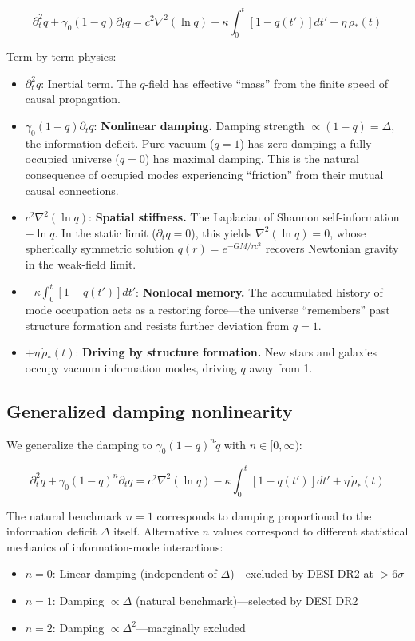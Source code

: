 \documentclass[12pt,a4paper]{article}
\begin{document}
\begin{equation}\label{sm:telegraph}
\boxed{\partial_t^2 q + \gamma_0(1-q)\partial_t q = c^2\nabla^2(\ln q) - \kappa\int_0^t [1-q(t')]dt' + \eta\,\dot{\rho}_*(t)}
\end{equation}

Term-by-term physics:
\begin{itemize}
\item $\partial_t^2 q$: Inertial term. The $q$-field has effective ``mass'' from the finite speed of causal propagation.
\item $\gamma_0(1-q)\partial_t q$: {\bf Nonlinear damping.} Damping strength $\propto(1-q)=\Delta$, the information deficit. Pure vacuum ($q=1$) has zero damping; a fully occupied universe ($q=0$) has maximal damping. This is the natural consequence of occupied modes experiencing ``friction'' from their mutual causal connections.
\item $c^2\nabla^2(\ln q)$: {\bf Spatial stiffness.} The Laplacian of Shannon self-information $-\ln q$. In the static limit ($\partial_t q=0$), this yields $\nabla^2(\ln q)=0$, whose spherically symmetric solution $q(r)=e^{-GM/rc^2}$ recovers Newtonian gravity in the weak-field limit.
\item $-\kappa\int_0^t [1-q(t')]dt'$: {\bf Nonlocal memory.} The accumulated history of mode occupation acts as a restoring force---the universe ``remembers'' past structure formation and resists further deviation from $q=1$.
\item $+\eta\,\dot{\rho}_*(t)$: {\bf Driving by structure formation.} New stars and galaxies occupy vacuum information modes, driving $q$ away from 1.
\end{itemize}

\subsection{Generalized damping nonlinearity}

We generalize the damping to $\gamma_0(1-q)^n\dot{q}$ with $n\in[0,\infty)$:

\begin{equation}
\partial_t^2 q + \gamma_0(1-q)^n\partial_t q = c^2\nabla^2(\ln q) - \kappa\int_0^t [1-q(t')]dt' + \eta\,\dot{\rho}_*(t)
\end{equation}

The natural benchmark $n=1$ corresponds to damping proportional to the information deficit $\Delta$ itself. Alternative $n$ values correspond to different statistical mechanics of information-mode interactions:
\begin{itemize}
\item $n=0$: Linear damping (independent of $\Delta$)---excluded by DESI DR2 at $>6\sigma$
\item $n=1$: Damping $\propto\Delta$ (natural benchmark)---selected by DESI DR2
\item $n=2$: Damping $\propto\Delta^2$---marginally excluded
\end{itemize}
\end{document}
